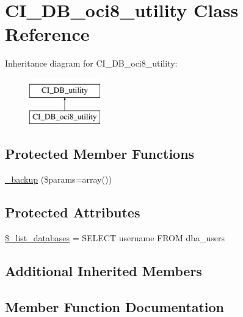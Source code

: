 \hypertarget{class_c_i___d_b__oci8__utility}{}\section{C\+I\+\_\+\+D\+B\+\_\+oci8\+\_\+utility Class Reference}
\label{class_c_i___d_b__oci8__utility}
Inheritance diagram for C\+I\+\_\+\+D\+B\+\_\+oci8\+\_\+utility\+:\begin{figure}[H]
\begin{center}
\leavevmode
\includegraphics[height=2.000000cm]{class_c_i___d_b__oci8__utility}
\end{center}
\end{figure}
\subsection*{Protected Member Functions}
\begin{DoxyCompactItemize}
\item 
\hyperlink{class_c_i___d_b__oci8__utility_a30f3053d2c82e7562349924363507afa}{\+\_\+backup} (\$params=array())
\end{DoxyCompactItemize}
\subsection*{Protected Attributes}
\begin{DoxyCompactItemize}
\item 
\hyperlink{class_c_i___d_b__oci8__utility_afe3a5b80562d93d6bc7e2b53c95b7e5a}{\$\+\_\+list\+\_\+databases} = \textquotesingle{}S\+E\+L\+E\+C\+T username F\+R\+O\+M dba\+\_\+users\textquotesingle{}
\end{DoxyCompactItemize}
\subsection*{Additional Inherited Members}


\subsection{Member Function Documentation}
\hypertarget{class_c_i___d_b__oci8__utility_a30f3053d2c82e7562349924363507afa}{}

